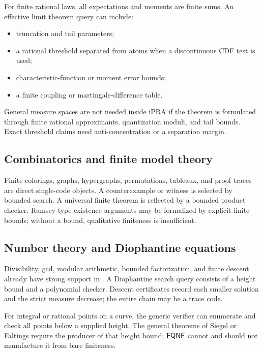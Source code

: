For finite rational laws, all expectations and moments are finite sums.  An
effective limit theorem query can include:

\begin{itemize}
\item truncation and tail parameters;
\item a rational threshold separated from atoms when a discontinuous CDF test
is used;
\item characteristic-function or moment error bounds;
\item a finite coupling or martingale-difference table.
\end{itemize}

General measure spaces are not needed inside iPRA if the theorem is formulated
through finite rational approximants, quantization moduli, and tail bounds.
Exact threshold claims need anti-concentration or a separation margin.

\subsection{Combinatorics and finite model theory}

Finite colorings, graphs, hypergraphs, permutations, tableaux, and proof traces
are direct single-code objects.  A counterexample or witness is selected by
bounded search.  A universal finite theorem is reflected by a bounded product
checker.  Ramsey-type existence arguments may be formalized by explicit
finite bounds; without a bound, qualitative finiteness is insufficient.

\subsection{Number theory and Diophantine equations}

Divisibility, gcd, modular arithmetic, bounded factorization, and finite descent
already have strong support in .  A Diophantine search
query consists of a height bound and a polynomial checker.  Descent certificates
record each smaller solution and the strict measure decrease; the entire chain
may be a trace code.

For integral or rational points on a curve, the generic verifier can enumerate
and check all points below a supplied height.  The general theorems of Siegel or
Faltings require the producer of that height bound; \(\mathsf{FQNF}\) cannot and should
not manufacture it from bare finiteness.

